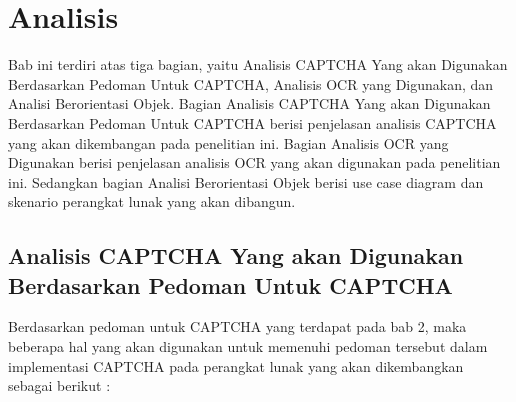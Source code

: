 \chapter{Analisis}
\label{chap:analisis}

Bab ini terdiri atas tiga bagian, yaitu Analisis CAPTCHA Yang akan Digunakan Berdasarkan Pedoman Untuk CAPTCHA, Analisis OCR yang Digunakan, dan Analisi Berorientasi Objek. Bagian Analisis CAPTCHA Yang akan Digunakan Berdasarkan Pedoman Untuk CAPTCHA berisi penjelasan analisis CAPTCHA yang akan dikembangan pada penelitian ini. Bagian Analisis OCR yang Digunakan berisi penjelasan analisis OCR yang akan digunakan pada penelitian ini. Sedangkan bagian Analisi Berorientasi Objek berisi use case diagram dan skenario perangkat lunak yang akan dibangun.

\section{Analisis CAPTCHA Yang akan Digunakan Berdasarkan Pedoman Untuk CAPTCHA}
\label{sec:analisisCAPTCHA}

Berdasarkan pedoman untuk CAPTCHA yang terdapat pada bab 2, maka beberapa hal yang akan digunakan untuk memenuhi pedoman tersebut dalam implementasi CAPTCHA pada perangkat lunak yang akan dikembangkan sebagai berikut :


